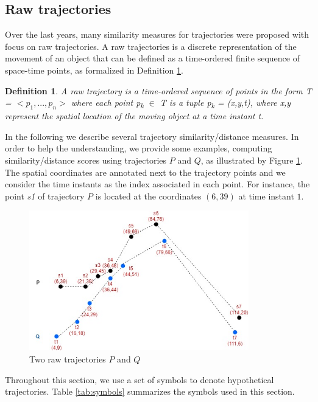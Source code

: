 \documentclass[12pt]{article}
\newtheorem{definition}{Definition}
\begin{document}
\subsection{Raw trajectories} \label{sec:related_raw}
Over the last years, many similarity measures for trajectories were proposed with focus on raw trajectories. A raw trajectories is a discrete representation of the movement of an object that can be defined as a time-ordered finite sequence of space-time points, as formalized in Definition \ref{def:raw_trajectory}. 

\begin{definition} \label{def:raw_trajectory} A raw trajectory is a time-ordered sequence of points in the form T = $<p_1,...,p_n>$ where each point p\textsubscript{k} $\in$ T is a tuple p\textsubscript{k} = (x,y,t), where x,y represent the spatial location of the moving object at a time instant t.
\end{definition}

In the following we describe several trajectory similarity/distance measures. In order to help the understanding, we provide some examples, computing similarity/distance scores using trajectories $P$ and $Q$, as illustrated by Figure \ref{fig:related_trajes}. The spatial coordinates are annotated next to the trajectory points and we consider the time instants as the index associated in each point. For instance, the point \emph{s1} of trajectory $P$ is located at the coordinates $(6,39)$ at time instant $1$.

\begin{figure}[h]
\centering
\includegraphics[width=0.85\textwidth]{Related_Works/related_trajes.jpg}
\caption{\label{fig:related_trajes}Two raw trajectories $P$ and $Q$}
\end{figure}

Throughout this section, we use a set of symbols to denote hypothetical trajectories. Table \ref{tab:symbols} summarizes the symbols used in this section.
\end{document}
